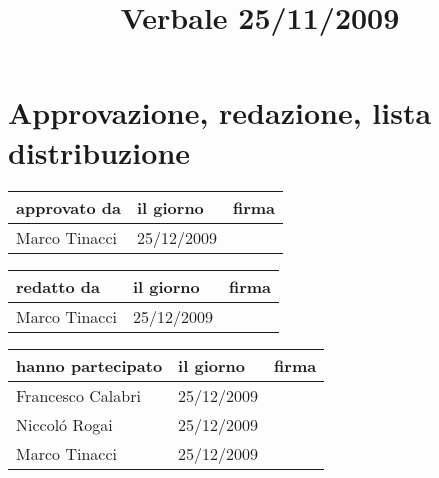 \documentclass[a4paper, 12pt]{report}
\title{Verbale 25/11/2009}
\date{25/11/2009 \\Firenze \\\begin{figure}[h] \centering \texttt{[image: ../../../../images/logokiwi.png]} \end{figure} }
\begin{document}
\maketitle

\newpage

\section*{Approvazione, redazione, lista distribuzione}
\begin{table}[h!]
  \begin{center}
    \begin{tabular}{| l | l | p{60mm} |}
    \hline
    \textbf{approvato da} & \textbf{il giorno} & \textbf{firma} \\
	\hline    
	Marco Tinacci & 25/12/2009 &  \\
    \hline
    \end{tabular}
  \end{center}
\end{table}

\begin{table}[h!]
  \begin{center}
    \begin{tabular}{| l | l | p{60mm} |}
    \hline
    \textbf{redatto da} & \textbf{il giorno} & \textbf{firma} \\
	\hline    
	Marco Tinacci & 25/12/2009 &  \\
    \hline
    \end{tabular}
  \end{center}
\end{table}

\begin{table}[h!]
  \begin{center}
    \begin{tabular}{| l | l | p{60mm} |}
    \hline
    \textbf{hanno partecipato} & \textbf{il giorno} & \textbf{firma} \\
	\hline    
	Francesco Calabri & 25/12/2009 &  \\
    \hline
	Niccol\'o Rogai & 25/12/2009 &  \\
    \hline
	Marco Tinacci & 25/12/2009 &  \\
    \hline
    \end{tabular}
  \end{center}
\end{table}

\newpage


\end{document}
